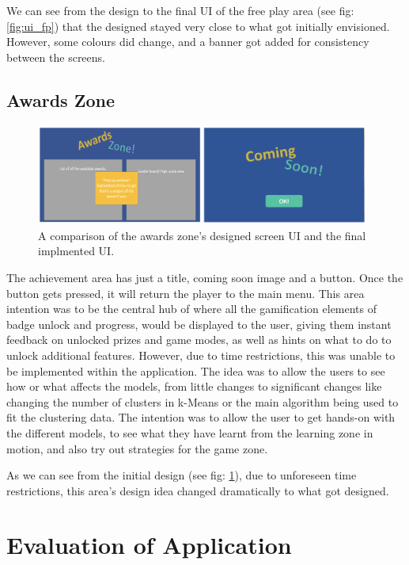 	We can see from the design to the final UI of the free play area (see fig: \ref{fig:ui_fp}) that the designed stayed very close to what got initially envisioned. However, some colours did change, and a banner got added for consistency between the screens.
	
	
	
	\subsection{Awards Zone}
	
	\begin{figure}[t]
		\begin{center}
			\includegraphics[width=11cm]{graphics/awards_zone.png}
			\caption{A comparison of the awards zone's designed screen UI and the final implmented UI.}
			\label{fig:ui_az}
		\end{center}
	\end{figure}
	
	
	The achievement area has just a title, coming soon image and a button. Once the button gets pressed, it will return the player to the main menu. This area intention was to be the central hub of where all the gamification elements of badge unlock and progress, would be displayed to the user, giving them instant feedback on unlocked prizes and game modes,  as well as hints on what to do to unlock additional features. However, due to time restrictions, this was unable to be implemented within the application. The idea was to allow the users to see how or what affects the models, from little changes to significant changes like changing the number of clusters in k-Means or the main algorithm being used to fit the clustering data. The intention was to allow the user to get hands-on with the different models, to see what they have learnt from the learning zone in motion, and also try out strategies for the game zone. 
	
	As we can see from the initial design (see fig: \ref{fig:ui_az}), due to unforeseen time restrictions, this area's design idea changed dramatically to what got designed.
	
			
	\section{Evaluation of Application}
		\label{sec:app_evaluation}
	
